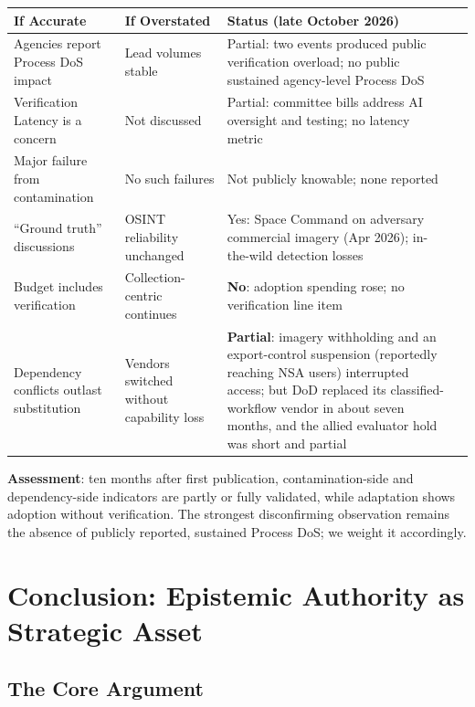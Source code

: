 \documentclass[11pt,letterpaper]{article}
\begin{document}
\begin{defbox}
\begin{center}
\scriptsize
\begin{tabularx}{\linewidth}{ZY{0.86}Y{0.71}Y{1.43}}
\toprule
\textbf{If Accurate} & \textbf{If Overstated} & \textbf{Status (late October 2026)} \\
\midrule
Agencies report Process DoS impact & Lead volumes stable & Partial: two events produced public verification overload; no public sustained agency-level Process DoS \\
Verification Latency is a concern & Not discussed & Partial: committee bills address AI oversight and testing; no latency metric \\
Major failure from contamination & No such failures & Not publicly knowable; none reported \\
``Ground truth'' discussions & OSINT reliability unchanged & Yes: Space Command on adversary commercial imagery (Apr 2026); in-the-wild detection losses \\
Budget includes verification & Collection-centric continues & \textbf{No}: adoption spending rose; no verification line item \\
Dependency conflicts outlast substitution & Vendors switched without capability loss & \textbf{Partial}: imagery withholding and an export-control suspension (reportedly reaching NSA users) interrupted access; but DoD replaced its classified-workflow vendor in about seven months, and the allied evaluator hold was short and partial \\
\bottomrule
\end{tabularx}
\end{center}
\textbf{Assessment}: ten months after first publication, contamination-side and dependency-side indicators are partly or fully validated, while adaptation shows adoption without verification. The strongest disconfirming observation remains the absence of publicly reported, sustained Process DoS; we weight it accordingly.
\end{defbox}

\section{Conclusion: Epistemic Authority as Strategic Asset}

\subsection{The Core Argument}
\end{document}
